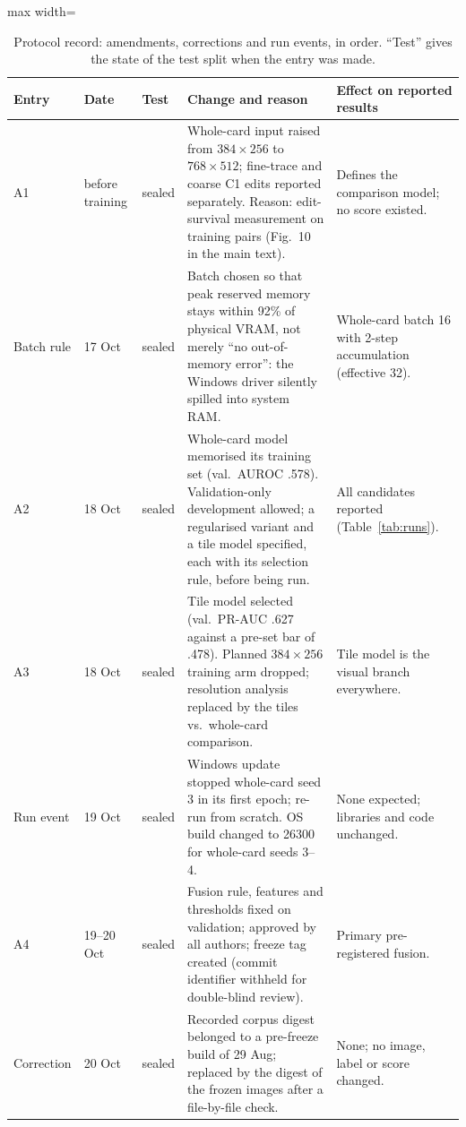 \documentclass[12pt]{article}
\begin{document}
\begin{table}[H]
\caption{Protocol record: amendments, corrections and run events, in
order. ``Test'' gives the state of the test split when the entry was
made.}
\label{tab:protocol}
\centering
\fontsize{8.5}{10}\selectfont
\setlength{\tabcolsep}{3.5pt}
\renewcommand{\arraystretch}{1.12}
\begin{adjustbox}{max width=\linewidth}
\begin{tabular}{@{}l l l p{} p{}@{}}
\toprule
Entry & Date & Test & Change and reason & Effect on reported results \\
\midrule
A1 & before training & sealed
  & Whole-card input raised from $384{\times}256$ to $768{\times}512$; fine-trace and coarse C1 edits reported separately. Reason: edit-survival measurement on training pairs (Fig.~10 in the main text).
  & Defines the comparison model; no score existed. \\
Batch rule & 17 Oct & sealed
  & Batch chosen so that peak reserved memory stays within 92\% of physical VRAM, not merely ``no out-of-memory error'': the Windows driver silently spilled into system RAM.
  & Whole-card batch 16 with 2-step accumulation (effective 32). \\
A2 & 18 Oct & sealed
  & Whole-card model memorised its training set (val.\ AUROC .578). Validation-only development allowed; a regularised variant and a tile model specified, each with its selection rule, before being run.
  & All candidates reported (Table~\ref{tab:runs}). \\
A3 & 18 Oct & sealed
  & Tile model selected (val.\ PR-AUC .627 against a pre-set bar of .478). Planned $384{\times}256$ training arm dropped; resolution analysis replaced by the tiles vs.\ whole-card comparison.
  & Tile model is the visual branch everywhere. \\
Run event & 19 Oct & sealed
  & Windows update stopped whole-card seed 3 in its first epoch; re-run from scratch. OS build changed to 26300 for whole-card seeds 3--4.
  & None expected; libraries and code unchanged. \\
A4 & 19--20 Oct & sealed
  & Fusion rule, features and thresholds fixed on validation; approved by all authors; freeze tag created (commit identifier withheld for double-blind review).
  & Primary pre-registered fusion. \\
Correction & 20 Oct & sealed
  & Recorded corpus digest belonged to a pre-freeze build of 29 Aug; replaced by the digest of the frozen images after a file-by-file check.
  & None; no image, label or score changed. \\

\end{tabular}
\end{adjustbox}
\end{table}
\end{document}
